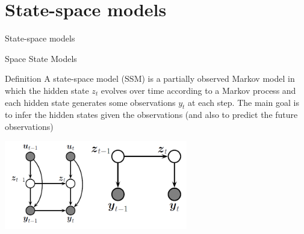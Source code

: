 \documentclass[11pt]{beamer}
\begin{document}
\section{State-space models}
\begin{frame}
\begin{center}
\Huge
State-space models
\end{center}
\end{frame}

\begin{frame}{Space State Models  \cite{pml2Book}}
\begin{alertblock}{Definition}
A state-space model (SSM) is a partially observed Markov model in which the hidden state $z_{t}$ evolves over time according to a Markov process and each hidden state generates some observations $y_{t}$ at each step. The main goal is to infer the hidden states given the observations (and also to predict the future observations)
\begin{center}
     \includegraphics[width=0.6\textwidth]{Pic/SSM.png}
    \end{center}
    \end{alertblock}
\end{frame}
\end{document}
